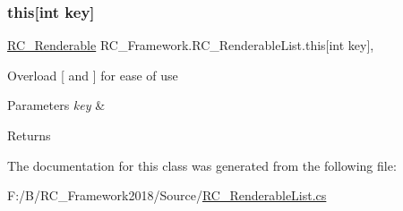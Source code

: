 \mbox{\label{class_r_c___framework_1_1_r_c___renderable_list_a8a63966970b03403ce48e9bcca4f795d}} 
\subsubsection{\texorpdfstring{this[int key]}{this[int key]}}
{\footnotesize\ttfamily \mbox{\hyperlink{class_r_c___framework_1_1_r_c___renderable}{R\+C\+\_\+\+Renderable}} R\+C\+\_\+\+Framework.\+R\+C\+\_\+\+Renderable\+List.\+this\mbox{[}int key\mbox{]}\hspace{0.3cm}{\ttfamily [get]}, {\ttfamily [set]}}



Overload \mbox{[} and \mbox{]} for ease of use 


\begin{DoxyParams}{Parameters}
{\em key} & \\
\hline
\end{DoxyParams}
\begin{DoxyReturn}{Returns}

\end{DoxyReturn}


The documentation for this class was generated from the following file\+:\begin{DoxyCompactItemize}
\item 
F\+:/\+B/\+R\+C\+\_\+\+Framework2018/\+Source/\mbox{\hyperlink{_r_c___renderable_list_8cs}{R\+C\+\_\+\+Renderable\+List.\+cs}}\end{DoxyCompactItemize}
